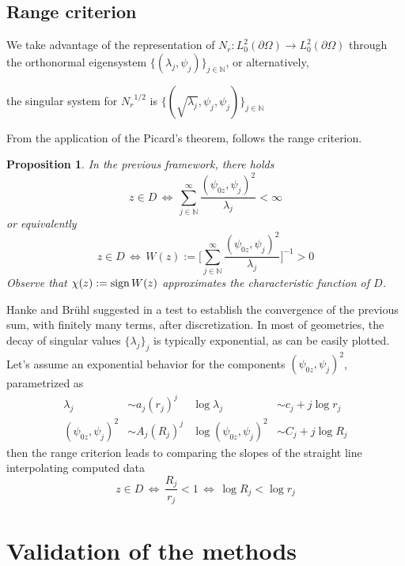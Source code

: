 \documentclass[10pt, a4paper, twoside, openright]{book}
\theoremstyle{definition}
\theoremstyle{plain}
\theoremstyle{plain}
\theoremstyle{plain}
\newtheorem{proposition}[subsection]{Proposition}
\theoremstyle{plain}
\theoremstyle{plain}
\theoremstyle{plain}
\theoremstyle{plain}
\theoremstyle{plain}
\begin{document}
\section{Range criterion}
We take advantage of the representation of ${N_r}:L^2_0(\partial \Omega)\to L^2_0(\partial \Omega)$ through the orthonormal eigensystem $\bigl\{(\lambda_j, \psi_j)\bigr\}_{j\in\mathbb{N}}$, or alternatively,
\begin{center}
the singular system for ${N_r}^{1/2}$ is $\bigl\{(\sqrt{\lambda_j}, \psi_j, \psi_j)\bigr\}_{j\in\mathbb{N}}$ 
\end{center}
From the application of the Picard's theorem, follows the range criterion.
\begin{proposition}
 In the previous framework, there holds
 \begin{equation}
  z \in D \, \Longleftrightarrow \, \sum_{j \in \mathbb{N}}^{\infty}\frac{(\psi_{0z}, \psi_j)^2}{\lambda_j} < \infty
 \end{equation}
 or equivalently
 \begin{equation}
  z \in D \, \Longleftrightarrow \, W(z):=\Bigg[\sum_{j \in \mathbb{N}}^{\infty}\frac{(\psi_{0z}, \psi_j)^2}{\lambda_j}\Bigg]^{-1} > 0
 \end{equation}
Observe that $\chi(z):=\textup{sign}\,W(z)$ approximates the characteristic function of $D$.
\end{proposition}
Hanke and Br\"{u}hl suggested in \cite{hanke-bruhl:recent} a test to establish the convergence of the previous sum, with finitely many terms, after discretization. In most of geometries, the decay of singular values $\bigl\{\lambda_j\bigr\}_j$ is typically exponential, as can be easily plotted. 
Let's assume an exponential behavior for the components $(\psi_{0z},\psi_j )^2$, parametrized as
\begin{align}
 \lambda_j &\sim a_j (r_j) ^j  & \log\lambda_j &\sim c_j + j\log r_j\\
 (\psi_{0z}, \psi_j)^2 &\sim A_j(R_j)^j & \log(\psi_{0z}, \psi_j)^2 &\sim C_j + j\log R_j
\end{align}
then the range criterion leads to comparing the slopes of the straight line interpolating computed data
\begin{equation}
 z\in D \,\Longleftrightarrow\, \dfrac{R_j}{r_j} < 1 \,\Longleftrightarrow\, \log R_j < \log r_j
\end{equation}

\chapter{Validation of the methods}
\label{ch:link}
\end{document}
